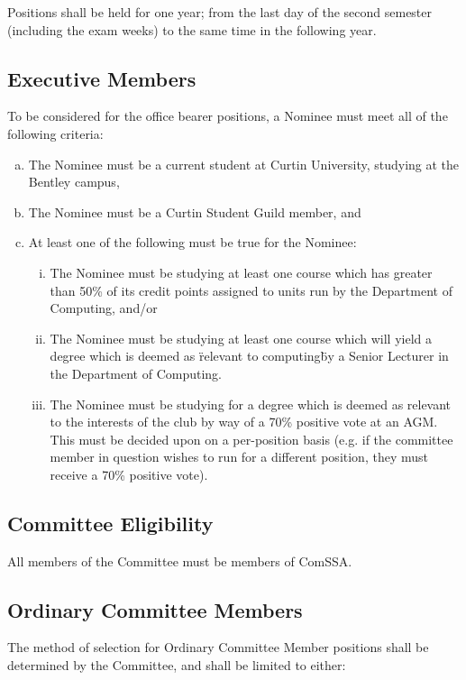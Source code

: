 \documentclass[a4paper,12pt]{article}
\begin{document}
Positions shall be held for one year; from the last day of the second semester (including the exam weeks) to the same time in the following year.

\subsection{Executive Members}

To be considered for the office bearer positions, a Nominee must meet all of the following criteria:

\begin{enumerate}[a)]
	\item The Nominee must be a current student at Curtin University, studying at the Bentley campus,
	\item The Nominee must be a Curtin Student Guild member, and
	\item At least one of the following must be true for the Nominee:
	\begin{enumerate}[i)]
		\item The Nominee must be studying at least one course which has greater than 50\% of its credit points assigned to units run by the Department of Computing, and/or
		\item The Nominee must be studying at least one course which will yield a degree which is deemed as \"relevant to computing\" by a Senior Lecturer in the Department of Computing.
		\item The Nominee must be studying for a degree which is deemed as relevant to the interests of the club by way of a 70\% positive vote at an AGM. This must be decided upon on a per-position basis (e.g. if the committee member in question wishes to run for a different position, they must receive a 70\% positive vote).
	\end{enumerate}
\end{enumerate}

\subsection{Committee Eligibility}

All members of the Committee must be members of ComSSA.

\subsection{Ordinary Committee Members}

The method of selection for Ordinary Committee Member positions shall be determined by the Committee, and shall be limited to either:
\end{document}
